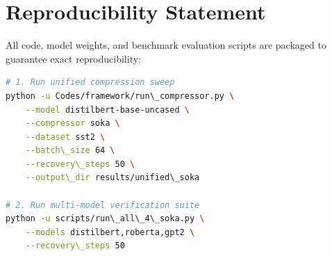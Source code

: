 \section{Reproducibility Statement}
All code, model weights, and benchmark evaluation scripts are packaged to guarantee exact reproducibility:
\begin{lstlisting}[language=bash]
# 1. Run unified compression sweep
python -u Codes/framework/run\_compressor.py \
    --model distilbert-base-uncased \
    --compressor soka \
    --dataset sst2 \
    --batch\_size 64 \
    --recovery\_steps 50 \
    --output\_dir results/unified\_soka

# 2. Run multi-model verification suite
python -u scripts/run\_all\_4\_soka.py \
    --models distilbert,roberta,gpt2 \
    --recovery\_steps 50
\end{lstlisting}
